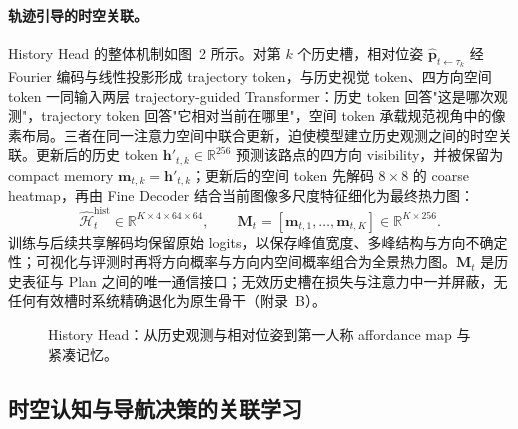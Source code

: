 \documentclass[10pt]{ctexart}
\begin{document}
\paragraph{轨迹引导的时空关联。}
History Head 的整体机制如图~2 所示。对第 $k$ 个历史槽，相对位姿 $\widehat{\mathbf{p}}_{t\leftarrow\tau_k}$ 经 Fourier 编码与线性投影形成 trajectory token，与历史视觉 token、四方向空间 token 一同输入两层 trajectory-guided Transformer：历史 token 回答"这是哪次观测"，trajectory token 回答"它相对当前在哪里"，空间 token 承载规范视角中的像素布局。三者在同一注意力空间中联合更新，迫使模型建立历史观测之间的时空关联。更新后的历史 token $\mathbf{h}'_{t,k}\in\mathbb{R}^{256}$ 预测该路点的四方向 visibility，并被保留为 compact memory $\mathbf{m}_{t,k}=\mathbf{h}'_{t,k}$；更新后的空间 token 先解码 $8\times8$ 的 coarse heatmap，再由 Fine Decoder 结合当前图像多尺度特征细化为最终热力图：
\[
\widehat{\mathcal{H}}^{\mathrm{hist}}_t
\in
\mathbb{R}^{K\times4\times64\times64},
\qquad
\mathbf{M}_t=[\mathbf{m}_{t,1},\ldots,\mathbf{m}_{t,K}]
\in
\mathbb{R}^{K\times256}.
\]
训练与后续共享解码均保留原始 logits，以保存峰值宽度、多峰结构与方向不确定性；可视化与评测时再将方向概率与方向内空间概率组合为全景热力图。$\mathbf{M}_t$ 是历史表征与 Plan 之间的唯一通信接口；无效历史槽在损失与注意力中一并屏蔽，无任何有效槽时系统精确退化为原生骨干（附录~B）。

\begin{figure}[h]
    \centering
    \caption{History Head：从历史观测与相对位姿到第一人称 affordance map 与紧凑记忆。}
    \label{fig:historyhead}
\end{figure}

\subsection{时空认知与导航决策的关联学习}
\label{sec:association}
\end{document}
